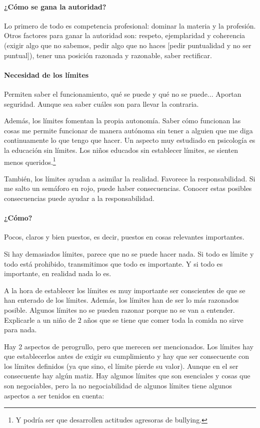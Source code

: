 \documentclass[palatino]{apuntesURJC}
\begin{document}
\paragraph{¿Cómo se gana la autoridad?} Lo primero de todo es competencia profesional: dominar la materia y la profesión. 
%
Otros factores para ganar la autoridad son: respeto, ejemplaridad y coherencia (exigir algo que no sabemos, pedir algo que no haces [pedir puntualidad y no ser puntual]), tener una posición razonada y razonable, saber rectificar.

\paragraph{Necesidad de los límites} Permiten saber el funcionamiento, qué se puede y qué no se puede... Aportan seguridad. Aunque sea saber cuáles son para llevar la contraria.

Además, los límites fomentan la propia autonomía. 
%
Saber cómo funcionan las cosas me permite funcionar de manera autónoma sin tener a alguien que me diga continuamente lo que tengo que hacer.
%
Un aspecto muy estudiado en psicología es la educación sin límites. 
%
Los niños educados sin establecer límites, se sienten menos queridos.\footnote{Y podría ser que desarrollen actitudes agresoras de bullying.}

También, los límites ayudan a asimilar la realidad. 
%
Favorece la responsabilidad.
%
Si me salto un semáforo en rojo, puede haber consecuencias. 
%
Conocer estas posibles consecuencias puede ayudar a la responsabilidad.

\paragraph{¿Cómo?} Pocos, claros y bien puestos, es decir, puestos en cosas relevantes importantes.

Si hay demasiados límites, parece que no se puede hacer nada. 
%
Si todo es límite y todo está prohibido, transmitimos que todo es importante.
%
Y si todo es importante, en realidad nada lo es.

A la hora de establecer los límites es muy importante ser conscientes de que se han enterado de los límites.
%
Además, los límites han de ser lo más razonados posible. 
%
Algunos límites no se pueden razonar porque no se van a entender.
%
Explicarle a un niño de 2 años que se tiene que comer toda la comida no sirve para nada.

Hay 2 aspectos de perogrullo, pero que merecen ser mencionados. 
%
Los límites hay que establecerlos antes de exigir su cumplimiento y hay que ser consecuente con los límites definidos (ya que sino, el límite pierde su valor).
%
Aunque en el ser consecuente hay algún matiz.
%
Hay algunos límites que son esenciales y cosas que son negociables, pero la no negociabilidad de algunos límites tiene algunos aspectos a ser tenidos en cuenta:
\end{document}
